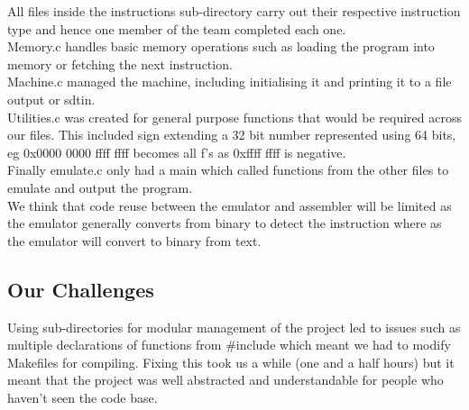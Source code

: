 \documentclass{article}
\begin{document}
All files inside the instructions sub-directory carry out their respective instruction type and hence one member of the team completed each one. \\
Memory.c handles basic memory operations such as loading the program into memory or fetching the next instruction.\\ 
Machine.c managed the machine, including initialising it and printing it to a file output or sdtin.\\
Utilities.c was created for general purpose functions that would be required across our files. This included sign extending a 32 bit number represented using 64 bits, eg 0x0000 0000 ffff ffff becomes all f's as 0xffff ffff is negative.\\
Finally emulate.c only had a main which called functions from the other files to emulate and output the program.\\
We think that code reuse between the emulator and assembler will be limited as the emulator generally converts from binary to detect the instruction where as the emulator will convert to binary from text.

\subsection{Our Challenges}
Using sub-directories for modular management of the project led to issues such as multiple declarations of functions from \#include which meant we had to modify Makefiles for compiling. Fixing this took us a while (one and a half hours) but it meant that the project was well abstracted and understandable for people who haven't seen the code base.
\end{document}
